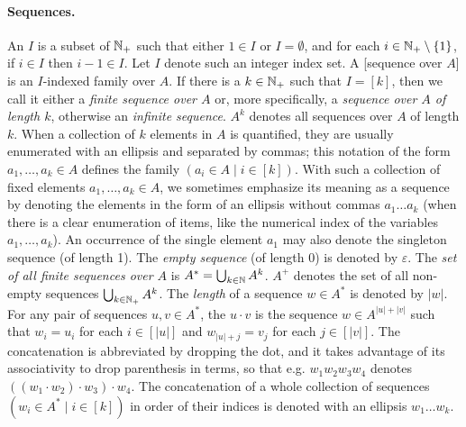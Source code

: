 \documentclass[../document.tex]{subfiles}
\begin{document}
    \paragraph{Sequences.}
    An  \(I\) is a subset of \(\mathbb{N}_+\) such that either \(1 \in I\) or \(I = \emptyset\), and for each \(i \in \mathbb{N}_+ \setminus \{1\}\), if \(i \in I\) then \(i-1 \in I\).
    Let \(I\) denote such an integer index set.
    A [sequence over \(A\)] is an \(I\)-indexed family over \(A\).
    If there is a \(k\in \mathbb{N}_+\) such that \(I = [k]\), then we call it either a \emph{finite sequence over \(A\)} or, more specifically, a \emph{sequence over \(A\) of length \(k\)}, otherwise an \emph{infinite sequence}.
    \(A^k\) denotes all sequences over \(A\) of length \(k\).
    When a collection of \(k\) elements in \(A\) is quantified, they are usually enumerated with an ellipsis and separated by commas; this notation of the form \(a_1, \ldots, a_k \in A\) defines the family \((a_i \in A \mid i \in [k])\).
    With such a collection of fixed elements \(a_1, \ldots, a_k \in A\), we sometimes emphasize its meaning as a sequence by denoting the elements in the form of an ellipsis without commas \(a_1 \ldots a_k\) (when there is a clear enumeration of items, like the numerical index of the variables \(a_1, \ldots, a_k\)).
    An occurrence of the single element \(a_1\) may also denote the singleton sequence (of length 1).
    The \emph{empty sequence} (of length 0) is denoted by \(\varepsilon\).
    The \emph{set of all finite sequences over \(A\)} is \(A^* = \bigcup_{k \in \mathbb{N}} A^k\).
    \(A^+\) denotes the set of all non-empty sequences \(\bigcup_{k \in \mathbb{N}_+} A^k\).
    The \emph{length} of a sequence \(w \in A^*\) is denoted by \(|w|\).
    For any pair of sequences \(u,v \in A^*\), the  \(u \cdot v\) is the sequence \(w\in A^{|u|+|v|}\) such that \(w_i=u_i\) for each \(i \in [|u|]\) and \(w_{|u|+j} = v_j\) for each \(j \in [|v|]\).
    The concatenation is abbreviated by dropping the dot, and it takes advantage of its associativity to drop parenthesis in terms, so that e.g. \(w_1 w_2 w_3 w_4\) denotes \(((w_1 \cdot w_2) \cdot w_3) \cdot w_4\).
    The concatenation of a whole collection of sequences \((w_i \in A^* \mid i \in [k])\) in order of their indices is denoted with an ellipsis \(w_1 \ldots w_k\).  
\end{document}
